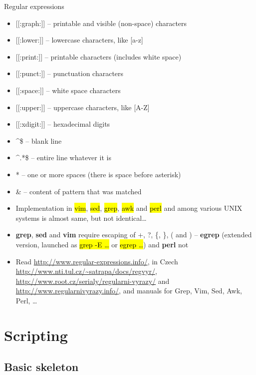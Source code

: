 \documentclass[compress, ucs, xelatex, 11pt, xcolor=svgnames,
  hyperref={
    bookmarks=true,
    unicode=true,
    colorlinks=true,
    pdftitle={Linux, command line and MetaCentrum},
    plainpages=false,
    pdfauthor={Vojtech Zeisek},
    pdfsubject={Course about use of Linux command line, writing shell scripts and using MetaCentrum of CESNET},
    pdfcreator={XeLaTeX},
    pdfkeywords={Linux, GNU, BASH, shell, command line, MetaCentrum},
    linkcolor=Red,
    anchorcolor=Blue,
    citecolor=Purple,
    filecolor=DodgerBlue,
    menucolor=DarkOrchid,
    urlcolor=DeepSkyBlue,
    pdftex},
  url={hyphens, lowtilde} %
  ]{beamer}
\renewcommand{\texttt}[1]{\hl{\ttfamily #1}}
\begin{document}
\begin{frame}[allowframebreaks]{Regular expressions}
\begin{itemize}
  \item \alert{[[:graph:]]} -- printable and visible (non-space) characters
  \item \alert{[[:lower:]]} -- lowercase characters, like \alert{[a-z]}
  \item \alert{[[:print:]]} -- printable characters (includes white space)
  \item \alert{[[:punct:]]} -- punctuation characters
  \item \alert{[[:space:]]} -- white space characters
  \item \alert{[[:upper:]]} -- uppercase characters, like \alert{[A-Z]}
  \item \alert{[[:xdigit:]]} -- hexadecimal digits
  \item \alert{\textasciicircum\$} -- blank line
  \item \alert{\textasciicircum.*\$} -- entire line whatever it is
  \item \alert{ *} -- one or more spaces (there is space before asterisk)
  \item \alert{\&} -- content of pattern that was matched
  \item Implementation in \texttt{vim}, \texttt{sed}, \texttt{grep}, \texttt{awk} and \texttt{perl} and among various UNIX systems is almost same, but not identical\ldots
  \item \textbf{grep}, \textbf{sed} and \textbf{vim} require escaping of \alert{+}, \alert{?}, \alert{\{}, \alert{\}}, \alert{(} and \alert{)} -- \textbf{egrep} (extended version, launched as \texttt{grep -E \ldots} or \texttt{egrep \ldots}) and \textbf{perl} not
  \item Read \url{http://www.regular-expressions.info/}, in Czech \url{http://www.nti.tul.cz/~satrapa/docs/regvyr/}, \url{http://www.root.cz/serialy/regularni-vyrazy/} and \url{http://www.regularnivyrazy.info/}, and manuals for Grep, Vim, Sed, Awk, Perl, \ldots
\end{itemize}
\end{frame}

\section{Scripting}

\subsection{Basic skeleton}
\end{document}
